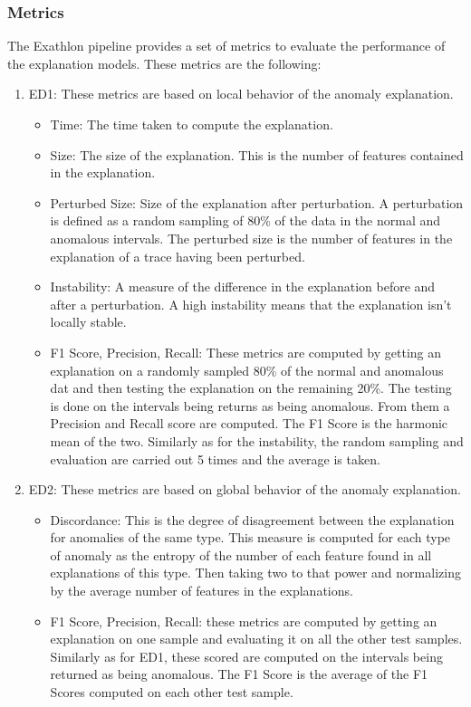 \documentclass[oneside, a4paper, onecolumn, 11pt]{article}
\begin{document}
\subsubsection{Metrics}
The Exathlon pipeline provides a set of metrics to evaluate the performance of the explanation models. These metrics are the following:
\begin{enumerate}
  \item ED1: These metrics are based on local behavior of the anomaly explanation.
  \begin{itemize}
    \item Time: The time taken to compute the explanation.
    \item Size: The size of the explanation. This is the number of features contained in the explanation.
    \item Perturbed Size: Size of the explanation after perturbation. A perturbation is defined as a random sampling of 80\% of the data in the normal and anomalous intervals. The perturbed size is the number of features in the explanation of a trace having been perturbed.
    \item Instability: A measure of the difference in the explanation before and after a perturbation. A high instability means that the explanation isn't locally stable.
    \item F1 Score, Precision, Recall: These metrics are computed by getting an explanation on a randomly sampled 80\% of the normal and anomalous dat and then testing the explanation on the remaining 20\%. The testing is done on the intervals being returns as being anomalous. From them a Precision and Recall score are computed. The F1 Score is the harmonic mean of the two. Similarly as for the instability, the random sampling and evaluation are carried out 5 times and the average is taken.
  \end{itemize}
  \item ED2: These metrics are based on global behavior of the anomaly explanation.
  \begin{itemize}
    \item Discordance: This is the degree of disagreement between the explanation for anomalies of the same type. This measure is computed for each type of anomaly as the entropy of the number of each feature found in all explanations of this type. Then taking two to that power and normalizing by the average number of features in the explanations.
    \item F1 Score, Precision, Recall: these metrics are computed by getting an explanation on one sample and evaluating it on all the other test samples. Similarly as for ED1, these scored are computed on the intervals being returned as being anomalous. The F1 Score is the average of the F1 Scores computed on each other test sample.
  \end{itemize}

\end{enumerate}
\end{document}
